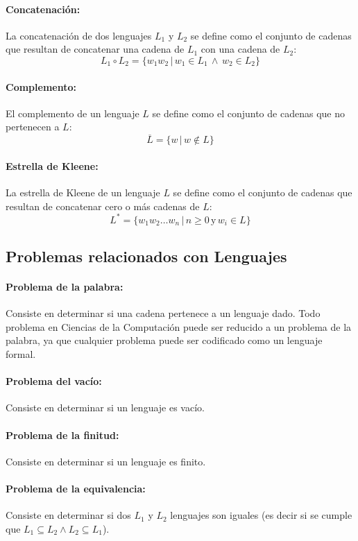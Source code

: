 \documentclass{article}
\begin{document}
\paragraph{Concatenación:} La concatenación de dos lenguajes $L_1$ y $L_2$ se define como el conjunto
de cadenas que resultan de concatenar una cadena de $L_1$ con una cadena de $L_2$:
$$L_1\circ L_2=\{w_1w_2\,|\,w_1\in L_1\,\wedge\,w_2\in L_2\}$$
\paragraph{Complemento:} El complemento de un lenguaje $L$ se define como el conjunto de cadenas que no
pertenecen a $L$:
$$\overline{L}=\{w\,|\,w\notin L\}$$
\paragraph{Estrella de Kleene:} La estrella de Kleene de un lenguaje $L$ se define como el conjunto de
cadenas que resultan de concatenar cero o más cadenas de $L$:
$$L^*=\{w_1w_2\ldots w_n\,|\,n\geq 0\,\text{y}\,w_i\in L\}$$

\subsection{Problemas relacionados con Lenguajes}

\paragraph{Problema de la palabra:} Consiste en determinar si una cadena pertenece a un lenguaje dado. Todo problema en Ciencias de la Computación puede ser reducido a un problema de la palabra, ya que cualquier problema
puede ser codificado como un lenguaje formal.
\paragraph{Problema del vacío:} Consiste en determinar si un lenguaje es vacío.
\paragraph{Problema de la finitud:} Consiste en determinar si un lenguaje es finito.
\paragraph{Problema de la equivalencia:} Consiste en determinar si dos $L_1$ y $L_2$ lenguajes son iguales (es decir si se cumple que
$L_1\subseteq L_2 \wedge L_2\subseteq L_1$).
\end{document}
